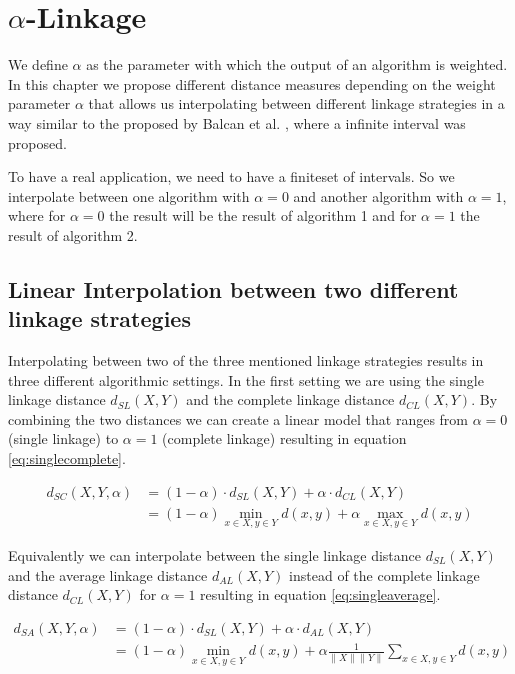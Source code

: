 \chapter{$\alpha$-Linkage}

We define $\alpha$ as the parameter with which the output of an algorithm is weighted. In this chapter we propose different distance measures depending on the weight parameter $\alpha$ that allows us interpolating between different linkage strategies in a way similar to the proposed by Balcan et al. \cite{DBLP:journals/corr/BalcanNVW16}, where a infinite interval was proposed.

To have a real application, we need to have a finiteset of intervals. So we interpolate between one algorithm with $\alpha = 0$ and another algorithm with $\alpha = 1$, where for $\alpha = 0$ the result will be the result of algorithm 1 and for $\alpha = 1$ the result of algorithm 2.

\section{Linear Interpolation between two different linkage strategies}

Interpolating between two of the three mentioned linkage strategies results in three different algorithmic settings. In the first setting we are using the single linkage distance $d_{SL}(X,Y)$ and the complete linkage distance $d_{CL}(X,Y)$. By combining the two distances we can create a linear model that ranges from $\alpha = 0$ (single linkage) to $\alpha = 1$ (complete linkage) resulting in equation \ref{eq:singlecomplete}.

\begin{equation}
    \begin{aligned}
        d_{SC}(X,Y,\alpha) &= (1 - \alpha) \cdot d_{SL}(X,Y) + \alpha \cdot d_{CL}(X,Y)\\
        &= (1 - \alpha) \min\limits_{x \in X, y \in Y} d(x,y) + \alpha \max\limits_{x \in X, y \in Y} d(x,y)
    \end{aligned}
    \label{eq:singlecomplete}
\end{equation}

Equivalently we can interpolate between the single linkage distance $d_{SL}(X,Y)$ and the average linkage distance $d_{AL}(X,Y)$ instead of the complete linkage distance $d_{CL}(X,Y)$ for $\alpha = 1$ resulting in equation \ref{eq:singleaverage}. 

\begin{equation}
    \begin{aligned}
        d_{SA}(X,Y,\alpha) &= (1 - \alpha) \cdot d_{SL}(X,Y) + \alpha \cdot d_{AL}(X,Y)\\
        &= (1 - \alpha) \min\limits_{x \in X, y \in Y} d(x,y) + \alpha \frac{1}{\|X\| \|Y\|}\sum\limits_{x \in X, y \in Y} d(x,y)
    \end{aligned}
    \label{eq:singleaverage}
\end{equation}

